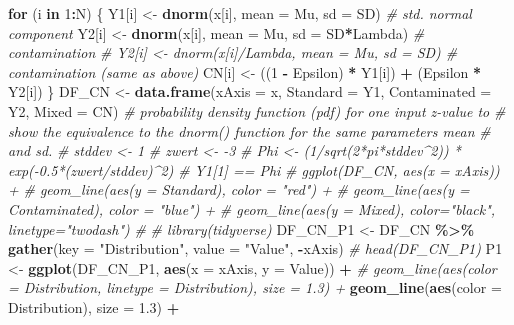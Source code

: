 \documentclass[
]{article}
\newenvironment{Shaded}{\begin{snugshade}}{\end{snugshade}}
\newcommand{\AttributeTok}[1]{\textcolor[rgb]{0.13,0.29,0.53}{#1}}
\newcommand{\CommentTok}[1]{\textcolor[rgb]{0.56,0.35,0.01}{\textit{#1}}}
\newcommand{\ControlFlowTok}[1]{\textcolor[rgb]{0.13,0.29,0.53}{\textbf{#1}}}
\newcommand{\DecValTok}[1]{\textcolor[rgb]{0.00,0.00,0.81}{#1}}
\newcommand{\FloatTok}[1]{\textcolor[rgb]{0.00,0.00,0.81}{#1}}
\newcommand{\FunctionTok}[1]{\textcolor[rgb]{0.13,0.29,0.53}{\textbf{#1}}}
\newcommand{\NormalTok}[1]{#1}
\newcommand{\OtherTok}[1]{\textcolor[rgb]{0.56,0.35,0.01}{#1}}
\newcommand{\SpecialCharTok}[1]{\textcolor[rgb]{0.81,0.36,0.00}{\textbf{#1}}}
\newcommand{\StringTok}[1]{\textcolor[rgb]{0.31,0.60,0.02}{#1}}
\begin{document}
\begin{Shaded}
\begin{Highlighting}[]
  \ControlFlowTok{for}\NormalTok{ (i }\ControlFlowTok{in} \DecValTok{1}\SpecialCharTok{:}\NormalTok{N) \{}
\NormalTok{    Y1[i]    }\OtherTok{\textless{}{-}} \FunctionTok{dnorm}\NormalTok{(x[i], }\AttributeTok{mean =}\NormalTok{ Mu, }\AttributeTok{sd =}\NormalTok{ SD) }\CommentTok{\# std. normal component}
\NormalTok{    Y2[i]    }\OtherTok{\textless{}{-}} \FunctionTok{dnorm}\NormalTok{(x[i], }\AttributeTok{mean =}\NormalTok{ Mu, }\AttributeTok{sd =}\NormalTok{ SD}\SpecialCharTok{*}\NormalTok{Lambda) }\CommentTok{\# contamination}
    \CommentTok{\# Y2[i]    \textless{}{-} dnorm(x[i]/Lambda, mean = Mu, sd = SD) \# contamination (same as above)}
\NormalTok{    CN[i] }\OtherTok{\textless{}{-}}\NormalTok{ ((}\DecValTok{1} \SpecialCharTok{{-}}\NormalTok{ Epsilon) }\SpecialCharTok{*}\NormalTok{ Y1[i]) }\SpecialCharTok{+}\NormalTok{ (Epsilon }\SpecialCharTok{*}\NormalTok{ Y2[i])}
\NormalTok{  \}}
\NormalTok{  DF\_CN  }\OtherTok{\textless{}{-}} \FunctionTok{data.frame}\NormalTok{(}\AttributeTok{xAxis =}\NormalTok{ x, }\AttributeTok{Standard =}\NormalTok{ Y1, }\AttributeTok{Contaminated =}\NormalTok{ Y2, }\AttributeTok{Mixed =}\NormalTok{ CN)}
    \CommentTok{\# probability density function (pdf) for one input z{-}value to}
    \CommentTok{\# show the equivalence to the dnorm() function for the same parameters mean}
    \CommentTok{\# and sd.}
    \CommentTok{\# stddev \textless{}{-} 1}
    \CommentTok{\# zwert  \textless{}{-} {-}3}
    \CommentTok{\# Phi \textless{}{-} (1/sqrt(2*pi*stddev\^{}2)) * exp({-}0.5*(zwert/stddev)\^{}2)}
    \CommentTok{\# Y1[1] == Phi}
  \CommentTok{\# ggplot(DF\_CN, aes(x = xAxis)) + }
  \CommentTok{\#   geom\_line(aes(y = Standard), color = "red") + }
  \CommentTok{\#   geom\_line(aes(y = Contaminated), color = "blue") + }
  \CommentTok{\#   geom\_line(aes(y = Mixed), color="black", linetype="twodash") }
  \CommentTok{\#}
  \CommentTok{\# library(tidyverse)}
\NormalTok{  DF\_CN\_P1 }\OtherTok{\textless{}{-}}\NormalTok{ DF\_CN }\SpecialCharTok{\%\textgreater{}\%} 
              \FunctionTok{gather}\NormalTok{(}\AttributeTok{key =} \StringTok{"Distribution"}\NormalTok{, }\AttributeTok{value =} \StringTok{"Value"}\NormalTok{, }\SpecialCharTok{{-}}\NormalTok{xAxis)}
  \CommentTok{\# head(DF\_CN\_P1)}
\NormalTok{  P1 }\OtherTok{\textless{}{-}} \FunctionTok{ggplot}\NormalTok{(DF\_CN\_P1, }\FunctionTok{aes}\NormalTok{(}\AttributeTok{x =}\NormalTok{ xAxis, }\AttributeTok{y =}\NormalTok{ Value)) }\SpecialCharTok{+}
        \CommentTok{\# geom\_line(aes(color = Distribution, linetype = Distribution), size = 1.3) + }
        \FunctionTok{geom\_line}\NormalTok{(}\FunctionTok{aes}\NormalTok{(}\AttributeTok{color =}\NormalTok{ Distribution), }\AttributeTok{size =} \FloatTok{1.3}\NormalTok{) }\SpecialCharTok{+} 

\end{Highlighting}
\end{Shaded}
\end{document}
